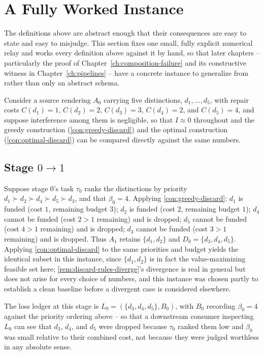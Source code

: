 \section{A Fully Worked Instance}
\label{sec:worked-relay}

The definitions above are abstract enough that their consequences are easy
to state and easy to misjudge. This section fixes one small, fully
explicit numerical relay and works every definition above against it by
hand, so that later chapters -- particularly the proof of
Chapter~\ref{ch:composition-failure} and its constructive witness in
Chapter~\ref{ch:pipelines} -- have a concrete instance to generalize from
rather than only an abstract schema.

Consider a source rendering $A_0$ carrying five distinctions, $d_1,
\ldots, d_5$, with repair costs $C(d_1) = 1$, $C(d_2) = 2$, $C(d_3) = 3$,
$C(d_4) = 2$, and $C(d_5) = 4$, and suppose interference among them is
negligible, so that $I \approx 0$ throughout and the greedy construction
(\cref{con:greedy-discard}) and the optimal construction
(\cref{con:optimal-discard}) can be compared directly against the same
numbers.

\subsection{Stage \texorpdfstring{$0 \to 1$}{0 to 1}}

Suppose stage $0$'s task $\tau_0$ ranks the distinctions by priority
$d_1 \succ d_2 \succ d_4 \succ d_5 \succ d_3$, and that $\beta_0 = 4$.
Applying \cref{con:greedy-discard}: $d_1$ is funded (cost $1$, remaining
budget $3$); $d_2$ is funded (cost $2$, remaining budget $1$); $d_4$
cannot be funded (cost $2 > 1$ remaining) and is dropped; $d_5$ cannot be
funded (cost $4 > 1$ remaining) and is dropped; $d_3$ cannot be funded
(cost $3 > 1$ remaining) and is dropped. Thus $A_1$ retains $\{d_1, d_2\}$
and $D_0 = \{d_3, d_4, d_5\}$. Applying \cref{con:optimal-discard} to the
same priorities and budget yields the identical subset in this instance,
since $\{d_1, d_2\}$ is in fact the value-maximizing feasible set here;
\cref{rem:discard-rules-diverge}'s divergence is real in general but does
not arise for every choice of numbers, and this instance was chosen partly
to establish a clean baseline before a divergent case is considered
elsewhere.

The loss ledger at this stage is $L_0 = (\{d_3, d_4, d_5\}, B_0)$, with
$B_0$ recording $\beta_0 = 4$ against the priority ordering above -- so
that a downstream consumer inspecting $L_0$ can see that $d_3$, $d_4$, and
$d_5$ were dropped because $\tau_0$ ranked them low and $\beta_0$ was
small relative to their combined cost, not because they were judged
worthless in any absolute sense.

